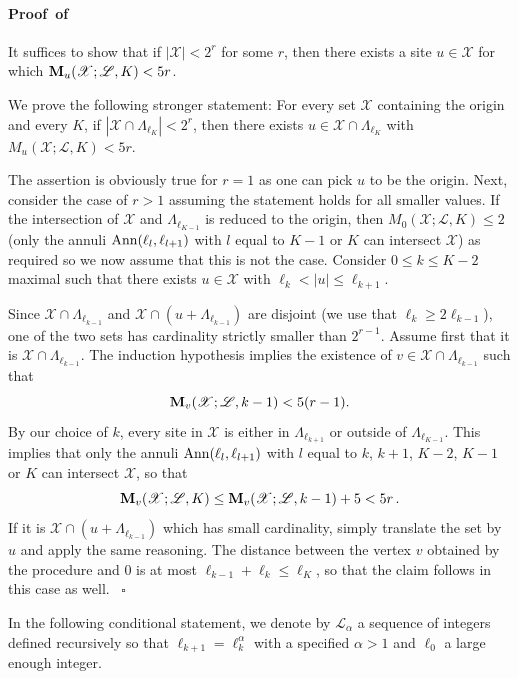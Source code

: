 \documentclass[a4paper,oneside,11pt]{article}
\newcommand{\be}[1]{\begin{equation}\label{#1}}
\newcommand{\ee}{\end{equation}}
\numberwithin{equation}{section}
\numberwithin{equation}{section}
\numberwithin{equation}{section}
\newenvironment{proof}[1][\relax]%
  {\paragraph{Proof\ifx#1\relax\else~of #1\fi}}%
  {~\hfill$\square$\par\bigskip}
\newcommand{\calL}{\mathcal{L}}
\newcommand{\calX}{\mathcal{X}}
\def\be{\begin{equation}}
\def\ee{\end{equation}}
\begin{document}
\begin{proof}  
It suffices to show that if  $|\mathcal X|< 2^r$ for some $r$, then there exists a site $u\in \mathcal X$ for which
${\bf M}_u(\mathcal X;\mathcal L, K) <5r$.

We prove the following stronger statement: For every set $\calX$ containing the origin and every $K$, if 
$|\mathcal X\cap \Lambda_{\ell_{K}}|< 2^r$, then there exists $u\in \calX\cap \Lambda_{\ell_K}$ with $M_u(\mathcal X;\mathcal L,K)<5r$.

The assertion is obviously true for $r=1$ as one can pick $u$ to be the origin.  Next,  consider the case of $r>1$  assuming the statement holds for all smaller values.  If the intersection of $\mathcal X$ and $\Lambda_{\ell_{K-1}}$ is reduced to the origin,  then $M_0(\mathcal X;\mathcal L,K)\le 2$ (only the annuli ${\rm Ann}(\ell_l,\ell_{l+1})$ with $l$ equal to $K-1$ or $K$ can intersect $\mathcal X$) as required so we now assume that this is not the case.
Consider $0\le k\le  K-2$ maximal such that there exists $u \in\mathcal X $ with $\ell_k<|u|\le \ell_{k+1}$.  

Since $\mathcal X\cap\Lambda_{\ell_{k-1}}$ and  $\mathcal X\cap(u+\Lambda_{\ell_{k-1}})$ are disjoint  (we use that $\ell_{k}\ge 2\ell_{k-1}$), one of the two sets has cardinality strictly smaller than $2^{r-1}$. Assume first that it is $\mathcal X\cap\Lambda_{\ell_{k-1}}$. The induction hypothesis implies the existence of $v\in \mathcal X\cap\Lambda_{\ell_{k-1}}$ such that 
\be
{\bf M}_v(\mathcal X;\calL,k-1) <5(r-1).
\ee  
By our choice of $k$, every site in $\mathcal X$ is either in $\Lambda_{\ell_{k+1}}$ or outside of $\Lambda_{\ell_{K-1}}$.  This implies that only the annuli ${\rm Ann}(\ell_l,\ell_{l+1})$ with $l$ equal to $k$, $k+1$, $K-2$, $K-1$ or $K$ can intersect $\mathcal X$, so that
\begin{equation}
{\bf M}_v(\mathcal X;  \mathcal L, K) \le {\bf M}_v(\mathcal X;\mathcal L, k-1) +5 < 5r \,.  
\end{equation}
If it is $\mathcal X\cap(u+\Lambda_{\ell_{k-1}})$ which has small cardinality, simply translate the set by $u$ and apply the same reasoning. The distance between the vertex $v$ obtained by the procedure and $0$ is at most $\ell_{k-1}+\ell_k\le \ell_K$, so that the claim follows in this case as well.
\end{proof} 
 
In  the following conditional statement,  we    denote by  $\mathcal L_\alpha$ a sequence of integers defined recursively so that 
$\ell_{k+1}=\ell_k^{\alpha}$ with a specified $\alpha>1$ and $\ell_0$ a large enough integer. 
\end{document}
